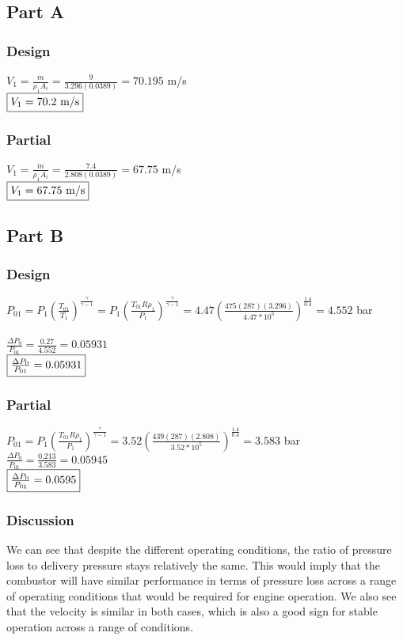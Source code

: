 \documentclass{article}
\begin{document}
\subsection*{Part A}
\subsubsection*{Design}
$V_1=\frac{\dot{m}}{\rho_1A_i}=\frac{9}{3.296(0.0389)}=70.195$ m/s \\
$\fbox{$V_1=70.2$ m/s}$

\subsubsection*{Partial}
$V_{1}=\frac{\dot{m}}{\rho_1A_i}=\frac{7.4}{2.808(0.0389)}=67.75$ m/s \\
$\fbox{$V_{1}=67.75$ m/s}$

\subsection*{Part B}
\subsubsection*{Design}
$P_{01}=P_1(\frac{T_{01}}{T_1})^\frac{\gamma}{\gamma-1}=P_1(\frac{T_{01}R\rho_1}{P_1})
^\frac{\gamma}{\gamma-1}=4.47(\frac{475(287)(3.296)}{4.47*10^5})^\frac{1.4}{0.4}=4.552$ bar \\\\
$\frac{\Delta P_0}{P_{01}}=\frac{0.27}{4.552}=0.05931$ \\
$\fbox{$\frac{\Delta P_0}{P_{01}}=0.05931$}$

\subsubsection*{Partial}
$P_{01}=P_1(\frac{T_{01}R\rho_1}{P_1})^\frac{\gamma}{\gamma-1}
=3.52(\frac{439(287)(2.808)}{3.52*10^5})^\frac{1.4}{0.4}=3.583$ bar \\
$\frac{\Delta P_0}{P_{01}}=\frac{0.213}{3.583}=0.05945$ \\
$\fbox{$\frac{\Delta P_0}{P_{01}}=0.0595$}$

\subsubsection*{Discussion}
We can see that despite the different operating conditions, the ratio of pressure loss to delivery
pressure stays relatively the same. This would imply that the combustor will have similar performance
in terms of pressure loss across a range of operating conditions that would be required for engine
operation. We also see that the velocity is similar in both cases, which is also a good sign for stable
operation across a range of conditions.
\end{document}
